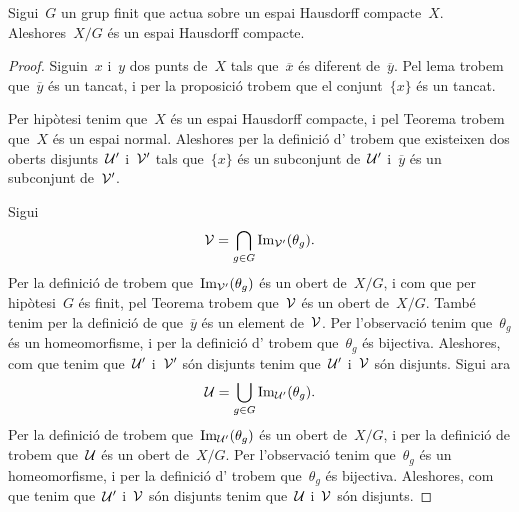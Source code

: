 \documentclass[../../Main.tex]{subfiles}
\begin{document}
	\begin{theorem}
		\label{thm:el quocient d'un Hausdorff compacte per un grup finit és Hausdorff compacte}
		Sigui~\(G\) un grup finit que actua sobre un espai Hausdorff compacte~\(X\).
		Aleshores~\(X/G\) és un espai Hausdorff compacte.
		\begin{proof} %
			Siguin~\(x\) i~\(y\) dos punts de~\(X\) tals que~\(\overline{x}\) és diferent de~\(\overline{y}\).
			Pel lema  trobem que~\(\overline{y}\) és un tancat, i per la proposició  trobem que el conjunt~\(\{x\}\) és un tancat.

			Per hipòtesi tenim que~\(X\) és un espai Hausdorff compacte, i pel Teorema  trobem que~\(X\) és un espai normal.
			Aleshores per la definició d' trobem que existeixen dos oberts disjunts~\(\mathcal{U}'\) i~\(\mathcal{V}'\) tals que~\(\{x\}\) és un subconjunt de~\(\mathcal{U}'\) i~\(\overline{y}\) és un subconjunt de~\(\mathcal{V}'\).

			Sigui
			\[
			    \mathcal{V}=\bigcap_{g\in G}\operatorname{Im}_{\mathcal{V}'}(\theta_{g}).
			\]
			Per la definició de  trobem que~\(\operatorname{Im}_{\mathcal{V}'}(\theta_{g})\) és un obert de~\(X/G\), i com que per hipòtesi~\(G\) és finit, pel Teorema  trobem que~\(\mathcal{V}\) és un obert de~\(X/G\).
			També tenim per la definició de  que~\(\overline{y}\) és un element de~\(\mathcal{V}\).
			Per l'observació  tenim que~\(\theta_{g}\) és un homeomorfisme, i per la definició d' trobem que~\(\theta_{g}\) és bijectiva.
			Aleshores, com que tenim que~\(\mathcal{U}'\) i~\(\mathcal{V}'\) són disjunts tenim que~\(\mathcal{U}'\) i~\(\mathcal{V}\) són disjunts.
			Sigui ara
			\[
			    \mathcal{U}=\bigcup_{g\in G}\operatorname{Im}_{\mathcal{U}'}(\theta_{g}).
			\]
			Per la definició de  trobem que~\(\operatorname{Im}_{\mathcal{U}'}(\theta_{g})\) és un obert de~\(X/G\), i per la definició de  trobem que~\(\mathcal{U}\) és un obert de~\(X/G\).
			Per l'observació  tenim que~\(\theta_{g}\) és un homeomorfisme, i per la definició d' trobem que~\(\theta_{g}\) és bijectiva.
			Aleshores, com que tenim que~\(\mathcal{U}'\) i~\(\mathcal{V}\) són disjunts tenim que~\(\mathcal{U}\) i~\(\mathcal{V}\) són disjunts.


\end{proof}
\end{theorem}
\end{document}
